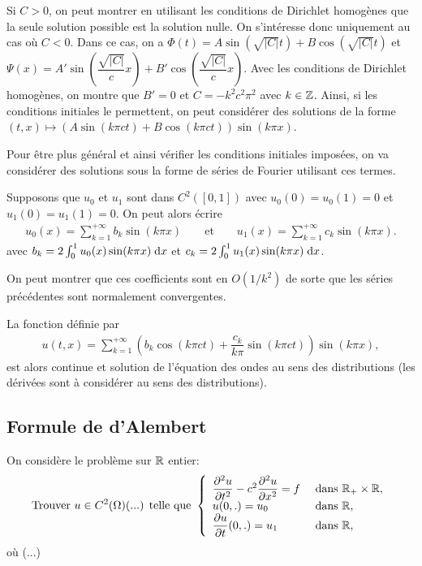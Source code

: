 \documentclass[12pt,a4paper,twoside]{article}
\begin{document}
Si $C > 0$, on peut montrer en utilisant les conditions de Dirichlet homog\`enes
que la seule solution possible est la solution nulle.
On s'int\'eresse donc uniquement au cas o\`u $C < 0$.
Dans ce cas, on a $\Phi(t) = A \sin(\sqrt{|C|} t) + B \cos(\sqrt{|C|} t)$
et $\Psi(x) = A' \sin(\dfrac{\sqrt{|C|}}{c} x) + B' \cos(\dfrac{\sqrt{|C|}}{c} x)$.
Avec les conditions de Dirichlet homog\`enes, on montre
que $B' = 0$ et $C = - k^2 c^2 \pi^2$ avec $k \in \mathbb{Z}$.
Ainsi, si les conditions initiales le permettent, on peut consid\'erer
des solutions de la forme
$(t,x) \mapsto (A \sin(k\pi c t) + B \cos(k\pi c t)) \sin(k \pi x)$.


Pour \^etre plus g\'en\'eral et ainsi v\'erifier les conditions initiales impos\'ees,
on va consid\'erer des solutions 
sous la forme de s\'eries de Fourier utilisant ces termes.

Supposons que $u_0$ et $u_1$ sont dans $C^{2}([0,1])$
avec $u_0(0) = u_0(1) = 0$
et $u_1(0) = u_1(1) = 0$.
On peut alors \'ecrire
\begin{align*}
  u_0(x) = \sum\limits_{k=1}^{+\infty} b_k \sin (k \pi x)
  \qquad \text{et} \qquad
  u_1(x) = \sum\limits_{k=1}^{+\infty} c_k \sin (k \pi x) .
\end{align*}
avec $b_k = 2 \int_0^1 u_0(x) \sin(k \pi x) \;\mathrm{d} x$
et $c_k = 2 \int_0^1 u_1(x) \sin(k \pi x) \;\mathrm{d} x$.

On peut montrer que ces coefficients sont en $O(1/k^2)$ de sorte que les s\'eries
pr\'ec\'edentes sont normalement convergentes.

La fonction d\'efinie par
\begin{align*}
  u(t,x) = \sum\limits_{k=1}^{+\infty} ( b_k \cos(k \pi c t) + \dfrac{c_k}{k \pi} \sin(k \pi c t) ) 
  \sin(k \pi x) ,
\end{align*}
est alors continue et solution de l'\'equation des ondes au sens des distributions
(les d\'eriv\'ees sont \`a consid\'erer au sens des distributions).

\subsection{Formule de d'Alembert}

On consid\`ere le probl\`eme sur $\mathbb{R}$ entier:
\begin{equation}
  \label{eq:ondes_R}
  \text{Trouver $u \in C^2(\Omega)$(...) telle que  }
  \left\{
    \begin{array}{l l}
      \dfrac{\partial^2 u}{\partial t^2} - c^2 \dfrac{\partial^2 u}{\partial x^2} = f 
      &\text{ dans } \mathbb{R}_+ \times \mathbb{R} ,
      \\
      u(0,.) = u_0 
      & \text{ dans } \mathbb{R} ,
      \\
      \dfrac{\partial u}{\partial t}(0,.) = u_1 
      & \text{ dans } \mathbb{R} ,
    \end{array}
  \right.
\end{equation}
o\`u (...)
\end{document}

